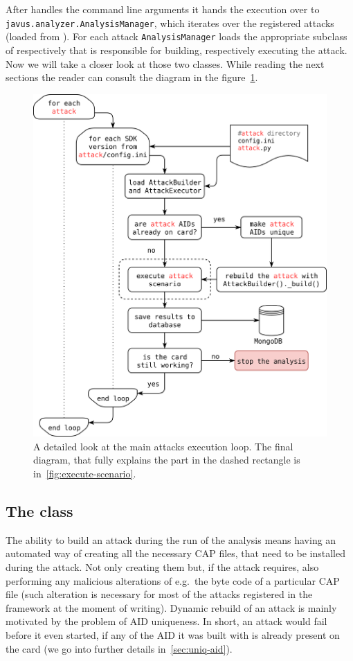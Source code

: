     After \shortappclass handles the command line arguments it hands the execution over to \texttt{javus.analyzer.AnalysisManager}, which iterates over the registered attacks (loaded from ). For each attack \texttt{AnalysisManager} loads the appropriate subclass of \shortbuilderclass respectively \shortexecutorclass that is responsible for building, respectively executing the attack. Now we will take a closer look at those two classes. While reading the next sections the reader can consult the diagram in the figure~\ref{fig:execute-attack-diagram}.

    \begin{figure}[htb]
        \centering
        \includegraphics[width=.8\textwidth]{src/diagrams/execute-attack.png}
        \caption{A detailed look at the main attacks execution loop. The final diagram, that fully explains the part in the dashed rectangle is in~\ref{fig:execute-scenario}.}
        \label{fig:execute-attack-diagram}
    \end{figure}



        \subsection{The class \builderclass}\label{subsec:builder-class}
        The ability to build an attack during the run of the analysis means having an automated way of creating all the necessary CAP files, that need to be installed during the attack. Not only creating them but, if the attack requires, also performing any malicious alterations of  e.g.\ the byte code of a particular CAP file (such alteration is necessary for most of the attacks registered in the framework at the moment of writing). Dynamic rebuild of an attack is mainly motivated by the problem of AID uniqueness. In short, an attack would fail before it even started, if any of the AID it was built with is already present on the card (we go into further details in~\ref{sec:uniq-aid}).

